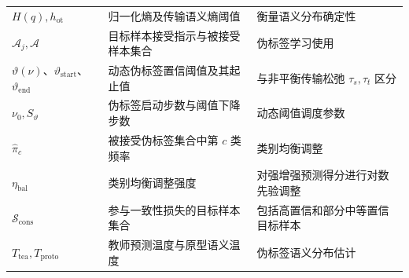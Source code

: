 \documentclass{seuthesis-2022}
\begin{document}
{\begin{longtable}{@{}>{\raggedright\arraybackslash}p{}>{\raggedright\arraybackslash}p{}>{\raggedright\arraybackslash}p{}@{}}
    $H(q),h_{\mathrm{ot}}$ & 归一化熵及传输语义熵阈值 & 衡量语义分布确定性 \\
    $\mathcal{A}_j,\mathcal{A}$ & 目标样本接受指示与被接受样本集合 & 伪标签学习使用 \\
    $\vartheta(\nu)$、$\vartheta_{\mathrm{start}}$、$\vartheta_{\mathrm{end}}$ & 动态伪标签置信阈值及其起止值 & 与非平衡传输松弛 $\tau_s,\tau_t$ 区分 \\
    $\nu_0,S_{\vartheta}$ & 伪标签启动步数与阈值下降步数 & 动态阈值调度参数 \\
    $\hat{\pi}_c$ & 被接受伪标签集合中第 $c$ 类频率 & 类别均衡调整 \\
    $\eta_{\mathrm{bal}}$ & 类别均衡调整强度 & 对强增强预测得分进行对数先验调整 \\
    $\mathcal{S}_{\mathrm{cons}}$ & 参与一致性损失的目标样本集合 & 包括高置信和部分中等置信目标样本 \\
    $T_{\mathrm{tea}},T_{\mathrm{proto}}$ & 教师预测温度与原型语义温度 & 伪标签语义分布估计 \\


\end{longtable}}
\end{document}
